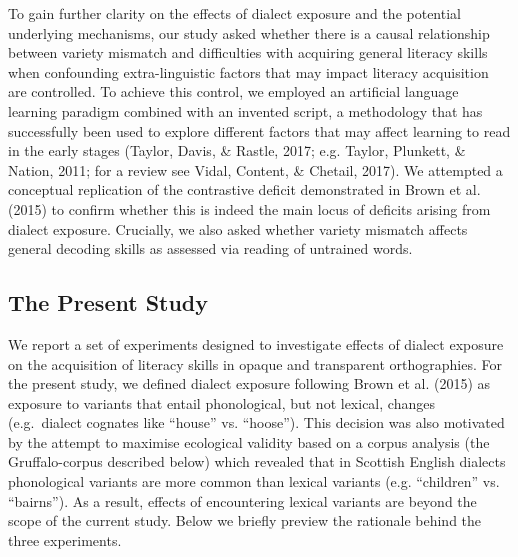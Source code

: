 \documentclass[doc,floatsintext]{apa6}
\begin{document}
To gain further clarity on the effects of dialect exposure and the
potential underlying mechanisms, our study asked whether there is a
causal relationship between variety mismatch and difficulties with
acquiring general literacy skills when confounding extra-linguistic
factors that may impact literacy acquisition are controlled. To achieve
this control, we employed an artificial language learning paradigm
combined with an invented script, a methodology that has successfully
been used to explore different factors that may affect learning to read
in the early stages (Taylor, Davis, \& Rastle, 2017; e.g. Taylor,
Plunkett, \& Nation, 2011; for a review see Vidal, Content, \& Chetail,
2017). We attempted a conceptual replication of the contrastive deficit
demonstrated in Brown et al. (2015) to confirm whether this is indeed
the main locus of deficits arising from dialect exposure. Crucially, we
also asked whether variety mismatch affects general decoding skills as
assessed via reading of untrained words.

\subsection{The Present Study}\label{the-present-study}

We report a set of experiments designed to investigate effects of
dialect exposure on the acquisition of literacy skills in opaque and
transparent orthographies. For the present study, we defined dialect
exposure following Brown et al. (2015) as exposure to variants that
entail phonological, but not lexical, changes (e.g.~dialect cognates
like \enquote{house} vs. \enquote{hoose}). This decision was also
motivated by the attempt to maximise ecological validity based on a
corpus analysis (the Gruffalo-corpus described below) which revealed
that in Scottish English dialects phonological variants are more common
than lexical variants (e.g. \enquote{children} vs. \enquote{bairns}). As
a result, effects of encountering lexical variants are beyond the scope
of the current study. Below we briefly preview the rationale behind the
three experiments.
\end{document}

